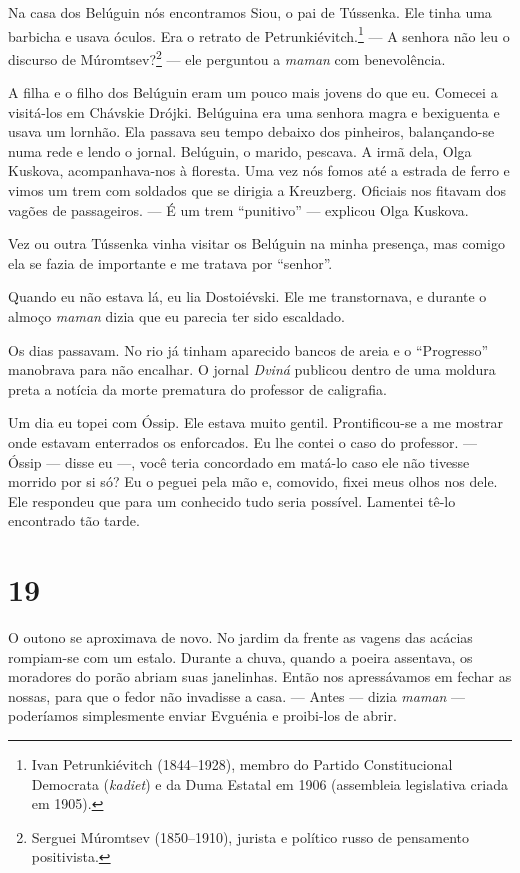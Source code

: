 Na casa dos Belúguin nós encontramos Siou, o pai de Tússenka. Ele tinha
uma barbicha e usava óculos. Era o retrato de Petrunkiévitch.\footnote{Ivan
  Petrunkiévitch (1844--1928), membro do Partido Constitucional
  Democrata (\emph{kadiet}) e da Duma Estatal em 1906 (assembleia
  legislativa criada em 1905).} --- A senhora não leu o discurso de
Múromtsev?\footnote{Serguei Múromtsev (1850--1910), jurista e político
  russo de pensamento positivista.} --- ele perguntou a \emph{maman} com
benevolência.

A filha e o filho dos Belúguin eram um pouco mais jovens do que eu.
Comecei a visitá-los em Chávskie Drójki. Belúguina era uma senhora magra
e bexiguenta e usava um lornhão. Ela passava seu tempo debaixo dos
pinheiros, balançando-se numa rede e lendo o jornal. Belúguin, o marido,
pescava. A irmã dela, Olga Kuskova, acompanhava-nos à floresta. Uma vez
nós fomos até a estrada de ferro e vimos um trem com soldados que se
dirigia a Kreuzberg. Oficiais nos fitavam dos vagões de passageiros. ---
É um trem ``punitivo'' --- explicou Olga Kuskova.

Vez ou outra Tússenka vinha visitar os Belúguin na minha presença, mas
comigo ela se fazia de importante e me tratava por ``senhor''.

Quando eu não estava lá, eu lia Dostoiévski. Ele me transtornava, e
durante o almoço \emph{maman} dizia que eu parecia ter sido escaldado.

Os dias passavam. No rio já tinham aparecido bancos de areia e o
``Progresso'' manobrava para não encalhar. O jornal \emph{Dviná}
publicou dentro de uma moldura preta a notícia da morte prematura do
professor de caligrafia.

Um dia eu topei com Óssip. Ele estava muito gentil. Prontificou-se a me
mostrar onde estavam enterrados os enforcados. Eu lhe contei o caso do
professor. --- Óssip --- disse eu ---, você teria concordado em matá-lo
caso ele não tivesse morrido por si só? Eu o peguei pela mão e,
comovido, fixei meus olhos nos dele. Ele respondeu que para um conhecido
tudo seria possível. Lamentei tê-lo encontrado tão tarde.

\section{19}

O outono se aproximava de novo. No jardim da frente as vagens das
acácias rompiam-se com um estalo. Durante a chuva, quando a poeira
assentava, os moradores do porão abriam suas janelinhas. Então nos
apressávamos em fechar as nossas, para que o fedor não invadisse a casa.
--- Antes --- dizia \emph{maman} --- poderíamos simplesmente enviar
Evguénia e proibi-los de abrir.

